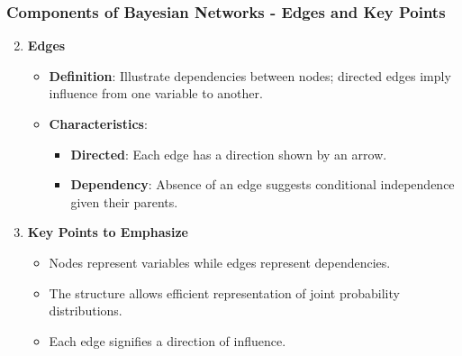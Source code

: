 \documentclass[aspectratio=169]{beamer}
\begin{document}
\begin{frame}[fragile]
    \frametitle{Components of Bayesian Networks - Edges and Key Points}
    \begin{enumerate}
        \setcounter{enumi}{1}
        \item \textbf{Edges}
        \begin{itemize}
            \item \textbf{Definition}: Illustrate dependencies between nodes; directed edges imply influence from one variable to another.
            \item \textbf{Characteristics}:
            \begin{itemize}
                \item \textbf{Directed}: Each edge has a direction shown by an arrow.
                \item \textbf{Dependency}: Absence of an edge suggests conditional independence given their parents.
            \end{itemize}
        \end{itemize}
        \item \textbf{Key Points to Emphasize}
        \begin{itemize}
            \item Nodes represent variables while edges represent dependencies.
            \item The structure allows efficient representation of joint probability distributions.
            \item Each edge signifies a direction of influence.
        \end{itemize}
    \end{enumerate}
\end{frame}
\end{document}
